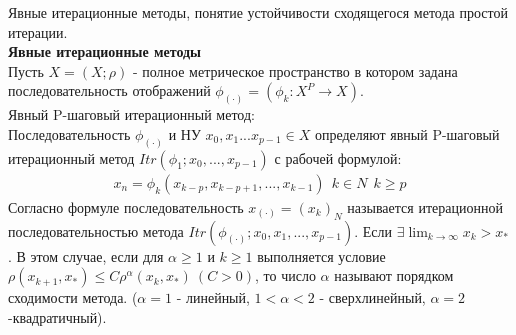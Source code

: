 \documentclass[__main__.tex]{subfiles}
\begin{document}
Явные итерационные методы, понятие устойчивости сходящегося метода простой итерации.\\

\textbf{Явные итерационные методы}\\

Пусть $X = (X;\rho)$ - полное метрическое пространство в котором задана последовательность отображений $\phi_{(\cdot)} = (\phi_k:X^P \to X)$.\\
Явный P-шаговый итерационный метод:\\
Последовательность $\phi_{(\cdot)}$ и НУ $x_0,x_1...x_{p-1} \in X$ определяют явный P-шаговый итерационный метод $Itr(\phi_1;x_0,...,x_{p-1})$ с рабочей формулой:\\
\begin{gather}
x_n = \phi_k(x_{k-p},x_{k-p+1},...,x_{k-1}) \ \ k \in N \ \ k\geq p
\end{gather}
Согласно формуле последовательность $x_{(\cdot)} = (x_k)_N$ называется итерационной последовательностью метода $Itr(\phi_{(\cdot)};x_0,x_1,...,x_{p-1})$. Если $\exists \lim_{k \to \infty} x_k > x_*$. В этом случае, если для $\alpha \geq 1$ и $k \geq 1$ выполняется условие $\rho(x_{k+1},x_*) \leq C \rho^\alpha (x_k,x_*) \ (C>0)$, то число $\alpha$ называют порядком сходимости метода. ($\alpha = 1$ - линейный, $1<\alpha<2$ - сверхлинейный, $\alpha = 2$ -квадратичный).
\end{document}
